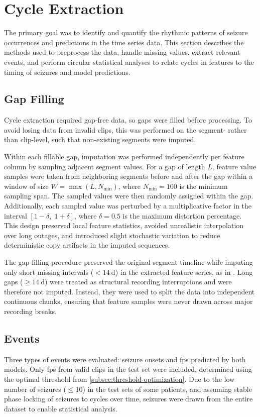 

\section{Cycle Extraction} \label{sec:cycle-extraction}

The primary goal was to identify and quantify the rhythmic patterns of seizure occurrences and predictions in the time series data.
This section describes the methods used to preprocess the data, handle missing values, extract relevant events, and perform circular statistical analyses to relate cycles in features to the timing of seizures and model predictions.

\subsection{Gap Filling} \label{subsec:gap-filling}
Cycle extraction required gap-free data, so gaps were filled before processing.
To avoid losing data from invalid clips, this was performed on the segment- rather than clip-level, such that non-existing segments were imputed.

Within each fillable gap, imputation was performed independently per feature column by sampling adjacent segment values.
For a gap of length $L$, feature value samples were taken from neighboring segments before and after the gap within a window of size $W=\max(L, N_{\min})$, where $N_{\min}=100$ is the minimum sampling span.
The sampled values were then randomly assigned within the gap.
Additionally, each sampled value was perturbed by a multiplicative factor in the interval $[1-\delta,\;1+\delta]$, where $\delta=0.5$ is the maximum distortion percentage.
This design preserved local feature statistics, avoided unrealistic interpolation over long outages, and introduced slight stochastic variation to reduce deterministic copy artifacts in the imputed sequences.

The gap-filling procedure preserved the original segment timeline while imputing only short missing intervals ($<\SI{14}{\day}$) in the extracted feature series, as in \textcite{yang_seizure_2024}.
Long gaps ($\geq\SI{14}{\day}$) were treated as structural recording interruptions and were therefore not imputed.
Instead, they were used to split the data into independent continuous chunks, ensuring that feature samples were never drawn across major recording breaks.


\subsection{Events} \label{subsec:cycle-events}
Three types of events were evaluated: seizure onsets and \glspl{fp} predicted by both models.
Only \glspl{fp} from valid clips in the test set were included, determined using the optimal threshold from \cref{subsec:threshold-optimization}.
Due to the low number of seizures ($\leq$10) in the test sets of some patients, and assuming stable phase locking of seizures to cycles over time, seizures were drawn from the entire dataset to enable statistical analysis.


